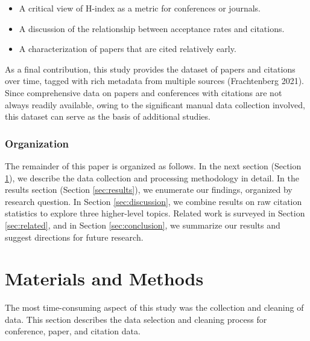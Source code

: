\documentclass{article}
\begin{document}
\begin{itemize}
\item
  A critical view of H-index as a metric for conferences or journals.
\item
  A discussion of the relationship between acceptance rates and citations.
\item
  A characterization of papers that are cited relatively early.
\end{itemize}

As a final contribution, this study provides the dataset of papers and citations over time, tagged with rich metadata from multiple sources (Frachtenberg 2021).
Since comprehensive data on papers and conferences with citations are not always readily available, owing to the significant manual data collection involved, this dataset can serve as the basis of additional studies.

\hypertarget{organization}{%
\subsubsection*{Organization}\label{organization}}

The remainder of this paper is organized as follows.
In the next section (Section \ref{sec:methods}), we describe the data collection and processing methodology in detail.
In the results section (Section \ref{sec:results}), we enumerate our findings, organized by research question.
In Section \ref{sec:discussion}, we combine results on raw citation statistics to explore three higher-level topics.
Related work is surveyed in Section \ref{sec:related}, and in Section \ref{sec:conclusion}, we summarize our results and suggest directions for future research.

\hypertarget{sec:methods}{%
\section{Materials and Methods}\label{sec:methods}}

The most time-consuming aspect of this study was the collection and cleaning of data.
This section describes the data selection and cleaning process for conference, paper, and citation data.
\end{document}
